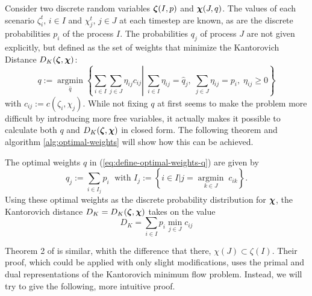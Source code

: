 Consider two discrete random variables $\boldsymbol\zeta(I,p)$ and $\boldsymbol\chi(J,q)$.
The values of each scenario $\zeta_i^t,\, i\in I$ and $\chi_j^t,\, j\in J$ at each timestep are known, as are the discrete probabilities $p_i$ of the process $I$.
The probabilities $q_j$ of process $J$ are not given explicitly, but defined as the set of weights that minimize the Kantorovich Distance $D_K(\boldsymbol\zeta,\boldsymbol\chi)$:
\begin{equation}
  \label{eq:define-optimal-weights-q}
  q := \underset{\hat{q}}{\operatorname{argmin}}\left\{\sum_{i\in I}\sum_{j\in J}\eta_{ij}c_{ij}\left|\; \sum_{i\in I}\eta_{ij} = \hat{q}_j,\; \sum_{j\in J}\eta_{ij} = p_i,\;\eta_{ij}\geq 0\right.\right\}
\end{equation}
with $c_{ij} := c(\zeta_i,\chi_j)$.
While not fixing $q$ at first seems to make the problem more difficult by introducing more free variables, it actually makes it possible to calculate both $q$ and $D_K(\boldsymbol\zeta,\boldsymbol\chi)$ in closed form.
The following theorem and algorithm \ref{alg:optimal-weights} will show how this can be achieved.
\begin{thm}
  \label{thm:optimal-weights}
  The optimal weights $q$ in (\ref{eq:define-optimal-weights-q}) are given by
  \begin{equation}
    \label{eq:optimal-weights-in-thm}
    q_j := \sum_{i\in I_j} p_i\;\text{ with } I_j:=\left\{i\in I| j = \underset{k\in J}{\operatorname{argmin}}\; c_{ik}\right\}.
  \end{equation}
  Using these optimal weights as the discrete probability distribution for $\boldsymbol\chi$, the Kantorovich distance $D_K=D_K(\boldsymbol\zeta,\boldsymbol\chi)$ takes on the value
  \begin{equation}
    \label{eq:define-Dk-optimalweights-thm}
    D_K = \sum_{i\in I}p_i\min\limits_{j\in J}c_{ij}
  \end{equation}
\end{thm}
Theorem 2 of  is similar, whith the difference that there, $\chi(J)\subset \zeta(I)$.
Their proof, which could be applied with only slight modifications, uses the primal and dual representations of the Kantorovich minimum flow problem.
Instead, we will try to give the following, more intuitive proof.
